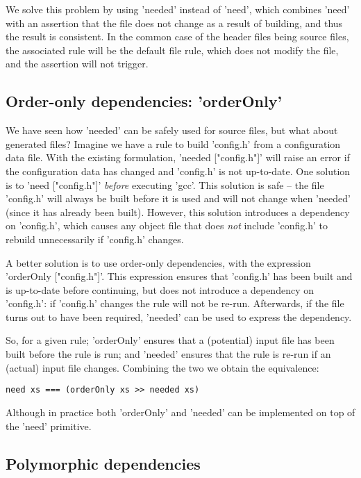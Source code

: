 We solve this problem by using \lst'needed' instead of \lst'need', which
combines \lst'need' with an assertion that the file does not change as a result
of building, and thus the result is consistent. In the common case of the header
files being source files, the associated rule will be the default file rule,
which does not modify the file, and the assertion will not trigger.

\subsection{Order-only dependencies: \lst'orderOnly'}

We have seen how \lst'needed' can be safely used for source files, but what
about generated files? Imagine we have a rule to build \lst'config.h' from a
configuration data file. With the existing formulation,
\lst'needed ["config.h"]' will raise an error if the configuration data has
changed and \lst'config.h' is not up-to-date. One solution is to \lst'need ["config.h"]'
\emph{before} executing \lst'gcc'. This solution is safe -- the file
\lst'config.h' will always be built before it is used and will not change when
\lst'needed' (since it has already been built). However, this solution
introduces a dependency on \lst'config.h', which causes any object file that
does \emph{not} include \lst'config.h' to rebuild unnecessarily if
\lst'config.h' changes.

A better solution is to use order-only dependencies, with the expression
\lst'orderOnly ["config.h"]'. This expression ensures that \lst'config.h' has
been built and is up-to-date before continuing, but does not introduce a
dependency on \lst'config.h': if \lst'config.h' changes
the rule will not be re-run. Afterwards, if the file turns out to have been
required, \lst'needed' can be used to express the dependency.

So, for a given rule; \lst'orderOnly' ensures that a (potential) input
file has been built before the rule is run; and \lst'needed' ensures
that the rule is re-run if an (actual) input file changes. Combining
the two we obtain the equivalence:

\begin{lstlisting}
need xs === (orderOnly xs >> needed xs)
\end{lstlisting}

\noindent Although in practice both \lst'orderOnly' and \lst'needed' can be
implemented on top of the \lst'need' primitive.

\subsection{Polymorphic dependencies\label{sec:polymorphic}}

